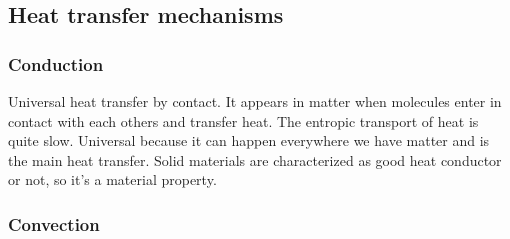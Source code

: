  \subsection{Heat transfer mechanisms}
 	\subsubsection{Conduction}
 		Universal heat transfer by contact. It appears in matter when molecules enter in contact with each others and transfer heat. The entropic transport of heat is quite slow. Universal because it can happen everywhere we have matter and is the main heat transfer. Solid materials are characterized as good heat conductor or not, so it's a material property.
 
 	\subsubsection{Convection}
